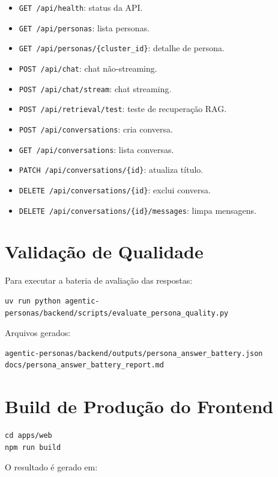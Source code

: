 \documentclass[12pt,a4paper]{article}
\begin{document}
\begin{itemize}
  \item \texttt{GET /api/health}: status da API.
  \item \texttt{GET /api/personas}: lista personas.
  \item \texttt{GET /api/personas/\{cluster\_id\}}: detalhe de persona.
  \item \texttt{POST /api/chat}: chat não-streaming.
  \item \texttt{POST /api/chat/stream}: chat streaming.
  \item \texttt{POST /api/retrieval/test}: teste de recuperação RAG.
  \item \texttt{POST /api/conversations}: cria conversa.
  \item \texttt{GET /api/conversations}: lista conversas.
  \item \texttt{PATCH /api/conversations/\{id\}}: atualiza título.
  \item \texttt{DELETE /api/conversations/\{id\}}: exclui conversa.
  \item \texttt{DELETE /api/conversations/\{id\}/messages}: limpa mensagens.
\end{itemize}

\section{Validação de Qualidade}

Para executar a bateria de avaliação das respostas:

\begin{verbatim}
uv run python agentic-personas/backend/scripts/evaluate_persona_quality.py
\end{verbatim}

Arquivos gerados:

\begin{verbatim}
agentic-personas/backend/outputs/persona_answer_battery.json
docs/persona_answer_battery_report.md
\end{verbatim}

\section{Build de Produção do Frontend}

\begin{verbatim}
cd apps/web
npm run build
\end{verbatim}

O resultado é gerado em:
\end{document}

